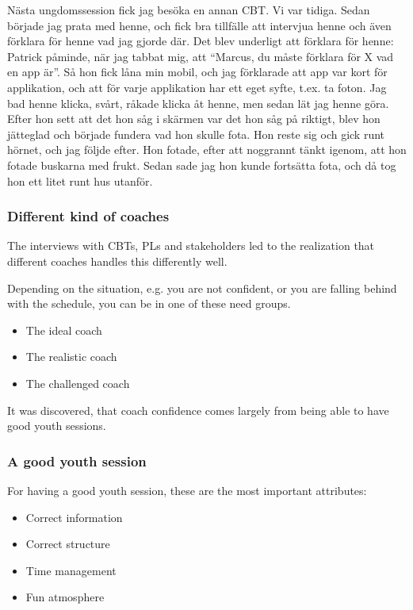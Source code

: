 Nästa ungdomssession fick jag besöka en annan CBT. Vi var tidiga. Sedan började jag prata med henne, och fick bra tillfälle att intervjua henne och även förklara för henne vad jag gjorde där. Det blev underligt att förklara för henne: Patrick påminde, när jag tabbat mig, att “Marcus, du måste förklara för X vad en app är”. Så hon fick låna min mobil, och jag förklarade att app var kort för applikation, och att för varje applikation har ett eget syfte, t.ex. ta foton. Jag bad henne klicka, svårt, råkade klicka åt henne, men sedan lät jag henne göra. Efter hon sett att det hon såg i skärmen var det hon såg på riktigt, blev hon jätteglad och började fundera vad hon skulle fota. Hon reste sig och gick runt hörnet, och jag följde efter. Hon fotade, efter att noggrannt tänkt igenom, att hon fotade buskarna med frukt. Sedan sade jag hon kunde fortsätta fota, och då tog hon ett litet runt hus utanför.


\subsubsection{Different kind of coaches}

The interviews with CBTs, PLs and stakeholders led to the realization that different coaches handles this differently well.

Depending on the situation, e.g. you are not confident, or you are falling behind with the schedule, you can be in one of these need groups.

\begin{itemize}
  \item The ideal coach
  \item The realistic coach
  \item The challenged coach
\end{itemize}

It was discovered, that coach confidence comes largely from being able to have good youth sessions.

\subsubsection{A good youth session}

For having a good youth session, these are the most important attributes:

\begin{itemize}
  \item Correct information
  \item Correct structure
  \item Time management
  \item Fun atmosphere
\end{itemize}

